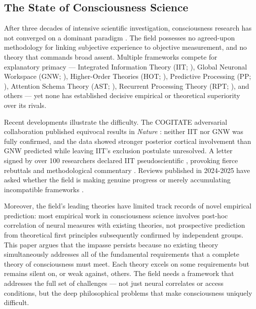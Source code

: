 \documentclass[12pt]{article}
\begin{document}
\subsection{The State of Consciousness Science}


After three decades of intensive scientific investigation, consciousness research has not converged on a dominant paradigm \citep{Kuhn1962}. The field possesses no agreed-upon methodology for linking subjective experience to objective measurement, and no theory that commands broad assent. Multiple frameworks compete for explanatory primacy --- Integrated Information Theory (IIT; \citealp{Tononi2004,Albantakis2023}), Global Neuronal Workspace (GNW; \citealp{Baars1988,Dehaene2011}), Higher-Order Theories (HOT; \citealp{Rosenthal2005,Lau2011}), Predictive Processing (PP; \citealp{Friston2010,Seth2021}), Attention Schema Theory (AST; \citealp{Graziano2013}), Recurrent Processing Theory (RPT; \citealp{Lamme2006,Lamme2010}), and others --- yet none has established decisive empirical or theoretical superiority over its rivals.

Recent developments illustrate the difficulty. The COGITATE adversarial collaboration published equivocal results in \emph{Nature} \citep[protocol:][]{COGITATE2025,Melloni2023}: neither IIT nor GNW was fully confirmed, and the data showed stronger posterior cortical involvement than GNW predicted while leaving IIT's exclusion postulate unresolved. A letter signed by over 100 researchers declared IIT pseudoscientific \citep{IITConcerned2025}, provoking fierce rebuttals \citep{TononiAlbantakis2025} and methodological commentary \citep{GomezMarin2025}. Reviews published in 2024-2025 have asked whether the field is making genuine progress or merely accumulating incompatible frameworks \citep{SethBayne2022,KirkebyHinrup2025b,WagnerAltendorf2024}.

Moreover, the field's leading theories have limited track records of novel empirical prediction: most empirical work in consciousness science involves post-hoc correlation of neural measures with existing theories, not prospective prediction from theoretical first principles subsequently confirmed by independent groups. This paper argues that the impasse persists because no existing theory simultaneously addresses all of the fundamental requirements that a complete theory of consciousness must meet. Each theory excels on some requirements but remains silent on, or weak against, others. The field needs a framework that addresses the full set of challenges --- not just neural correlates or access conditions, but the deep philosophical problems that make consciousness uniquely difficult.
\end{document}
